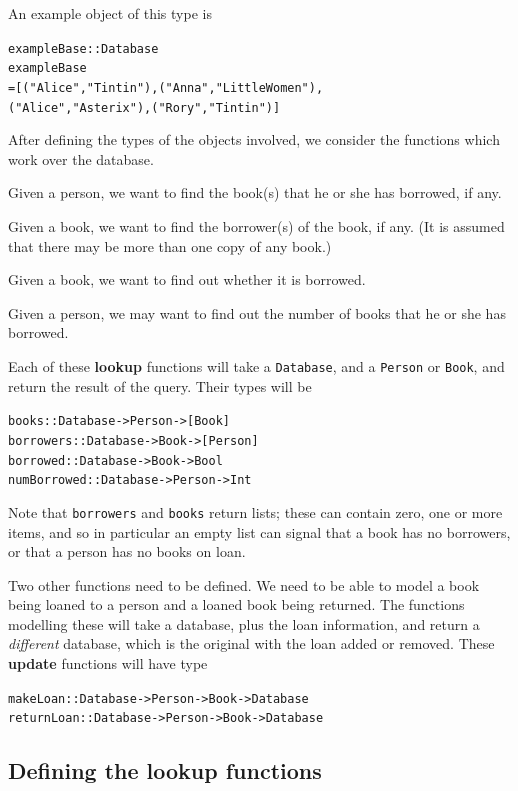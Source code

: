 An example object of this type is
\begin{alltt}
exampleBase :: Database
exampleBase 
= [ ("Alice" , "Tintin")  , ("Anna" , "Little Women") ,
    ("Alice" , "Asterix") , ("Rory" , "Tintin") ]
\end{alltt}
After defining the types of the objects involved, we consider the functions
which work over the database.
\begin{titemize}
\item Given a person, we want to find the book(s) that he or she has borrowed, if any. 
\item Given a book, we want to find the borrower(s) of the book, if any. (It
is assumed that there may be more than one copy of any book.)
\item Given a book, we want to find out whether it is borrowed.
\item Given a person, we may want to find out the number of books that he or she has
borrowed.
\end{titemize}
Each of these {\bf lookup} functions will take a \texttt{Database}, and a 
\texttt{Person} or \texttt{Book}, and return the result of the query. Their types will be
\begin{alltt}
books       :: Database -> Person -> [Book]
borrowers   :: Database -> Book -> [Person]
borrowed    :: Database -> Book -> Bool
numBorrowed :: Database -> Person -> Int
\end{alltt}
Note that \texttt{borrowers} and \texttt{books} return lists; these can contain
zero, one or more items, and so in particular an empty list can signal that a book has no
borrowers, or that a person has no books on loan.

Two other functions need to be defined. We need to be able to model a book being loaned to 
a person and a loaned book being returned. The functions modelling these
will take a
database, plus the loan information, and return a {\em different\/} database,
which is the original with the loan added or removed. These {\bf update}
functions will have type
\begin{alltt}
makeLoan   :: Database -> Person -> Book -> Database
returnLoan :: Database -> Person -> Book -> Database
\end{alltt}

\subsection*{Defining the lookup functions}

